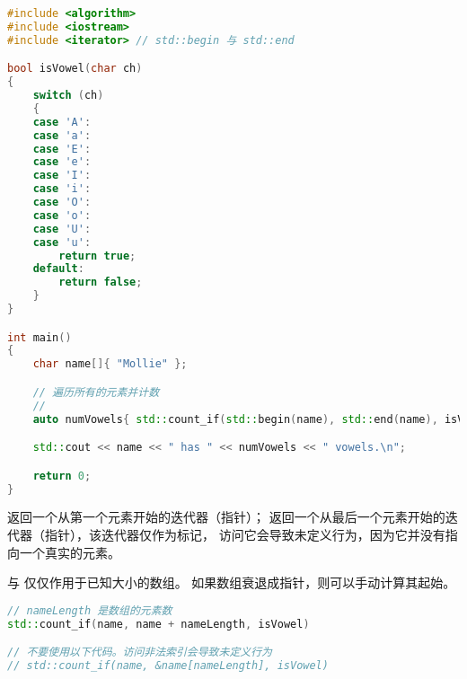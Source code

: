 \documentclass[../../LearnCpp.tex]{subfiles}
\begin{document}
\begin{lstlisting}[language=C++]
#include <algorithm>
#include <iostream>
#include <iterator> // std::begin 与 std::end

bool isVowel(char ch)
{
    switch (ch)
    {
    case 'A':
    case 'a':
    case 'E':
    case 'e':
    case 'I':
    case 'i':
    case 'O':
    case 'o':
    case 'U':
    case 'u':
        return true;
    default:
        return false;
    }
}

int main()
{
    char name[]{ "Mollie" };

    // 遍历所有的元素并计数
    //
    auto numVowels{ std::count_if(std::begin(name), std::end(name), isVowel) };

    std::cout << name << " has " << numVowels << " vowels.\n";

    return 0;
}
\end{lstlisting}

 返回一个从第一个元素开始的迭代器（指针）；
 返回一个从最后一个元素开始的迭代器（指针），该迭代器仅作为标记，
访问它会导致未定义行为，因为它并没有指向一个真实的元素。

 与  仅仅作用于已知大小的数组。
如果数组衰退成指针，则可以手动计算其起始。

\begin{lstlisting}[language=C++]
// nameLength 是数组的元素数
std::count_if(name, name + nameLength, isVowel)

// 不要使用以下代码。访问非法索引会导致未定义行为
// std::count_if(name, &name[nameLength], isVowel)
\end{lstlisting}
\end{document}
